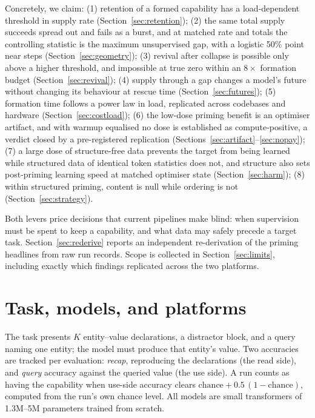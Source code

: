 \documentclass{article}
\begin{document}
Concretely, we claim:
(1) retention of a formed capability has a load-dependent threshold in supply rate
(Section~\ref{sec:retention});
(2) the same total supply succeeds spread out and fails as a burst, and at matched rate and
totals the controlling statistic is the maximum unsupervised gap, with a logistic 50\% point
near \GapFifty{} steps (Section~\ref{sec:geometry});
(3) revival after collapse is possible only above a higher threshold, and impossible at true
zero within an $8\times$ formation budget (Section~\ref{sec:revival});
(4) supply through a gap changes a model's future without changing its behaviour at rescue
time (Section~\ref{sec:futures});
(5) formation time follows a power law in load, replicated across codebases and hardware
(Section~\ref{sec:costload});
(6) the low-dose priming benefit is an optimiser artifact, and with warmup equalised no dose
is established as compute-positive, a verdict closed by a pre-registered replication
(Sections~\ref{sec:artifact}--\ref{sec:nopay});
(7) a large dose of structure-free data prevents the target from being learned while
structured data of identical token statistics does not, and structure also sets post-priming
learning speed at matched optimiser state (Section~\ref{sec:harm});
(8) within structured priming, content is null while ordering is not
(Section~\ref{sec:strategy}).

Both levers price decisions that current pipelines make blind: when supervision must be spent to
keep a capability, and what data may safely precede a target task. Section~\ref{sec:rederive}
reports an independent re-derivation of the priming headlines from raw run records. Scope is
collected in Section~\ref{sec:limits}, including exactly which findings replicated across the
two platforms.

\section{Task, models, and platforms}
\label{sec:task}

The task presents $K$ entity--value declarations, a distractor block, and a query naming one
entity; the model must produce that entity's value. Two accuracies are tracked per
evaluation: \emph{recap}, reproducing the declarations (the read side), and \emph{query}
accuracy against the queried value (the use side). A run counts as having the capability when
use-side accuracy clears $\mathrm{chance} + 0.5\,(1-\mathrm{chance})$, computed from the
run's own chance level. All models are small transformers of 1.3M--5M parameters trained from
scratch.
\end{document}

